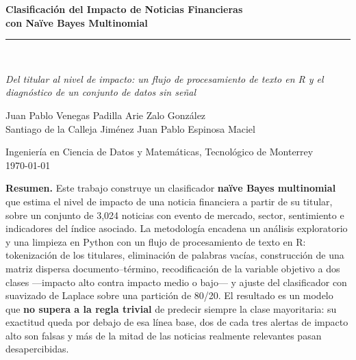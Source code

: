 \documentclass[11pt, a4paper]{article}
\begin{document}
\begin{center}
    \vspace*{0.3cm}
    {\LARGE\bfseries\color{azuloscuro}
        Clasificación del Impacto de Noticias Financieras\\[0.2em]
        con Naïve Bayes Multinomial\par}
    \vspace{0.5em}
    \rule{0.85\textwidth}{1pt}\\[0.4em]
    {\large\itshape Del titular al nivel de impacto: un flujo de procesamiento de texto en R
    y el diagnóstico de un conjunto de datos sin señal\par}
    \vspace{0.8em}
    {\normalsize
    Juan Pablo Venegas Padilla \quad\textbullet\quad Arie Zalo González\\[0.25em]
    Santiago de la Calleja Jiménez \quad\textbullet\quad Juan Pablo Espinosa Maciel\par}
    \vspace{0.3em}
    {\small Ingeniería en Ciencia de Datos y Matemáticas, Tecnológico de Monterrey\\[0.15em]
    \today\par}
    \vspace{0.8em}
    \colorbox{azulclaro}{%
        \parbox{0.92\textwidth}{\small
            \vspace{0.2cm}
            \textbf{Resumen.} Este trabajo construye un clasificador \textbf{naïve Bayes
            multinomial} que estima el nivel de impacto de una noticia financiera a partir de su
            titular, sobre un conjunto de 3{,}024 noticias con evento de mercado, sector,
            sentimiento e indicadores del índice asociado. La metodología encadena un análisis
            exploratorio y una limpieza en Python con un flujo de procesamiento de texto en R:
            tokenización de los titulares, eliminación de palabras vacías, construcción de una
            matriz dispersa documento--término, recodificación de la variable objetivo a dos
            clases —impacto alto contra impacto medio o bajo— y ajuste del clasificador con
            suavizado de Laplace sobre una partición de 80/20. El resultado es un modelo que
            \textbf{no supera a la regla trivial} de predecir siempre la clase mayoritaria: su
            exactitud queda por debajo de esa línea base, dos de cada tres alertas de impacto alto
            son falsas y más de la mitad de las noticias realmente relevantes pasan desapercibidas.
}}
\end{center}
\end{document}
